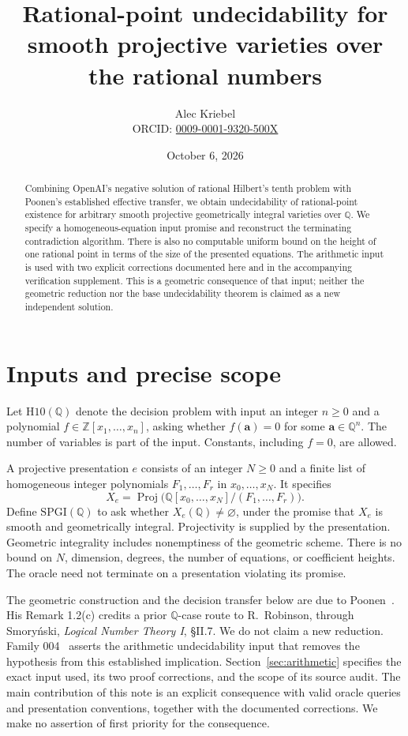 \documentclass[11pt]{article}
\title{Rational-point undecidability for smooth projective varieties over the rational numbers}
\author{Alec Kriebel\\\small ORCID: \href{https://orcid.org/0009-0001-9320-500X}{0009-0001-9320-500X}}
\date{October 6, 2026}
\newcommand{\Q}{\mathbb Q}
\newcommand{\Z}{\mathbb Z}
\begin{document}
\maketitle
\begin{abstract}
Combining OpenAI's negative solution of rational Hilbert's tenth problem
with Poonen's established effective transfer, we obtain undecidability of
rational-point existence for arbitrary smooth projective geometrically
integral varieties over $\Q$. We specify a homogeneous-equation input
promise and reconstruct the terminating contradiction algorithm. There is
also no computable uniform bound on the height of one rational point in
terms of the size of the presented equations. The arithmetic input is used
with two explicit corrections documented here and in the accompanying
verification supplement. This is a geometric consequence of that input;
neither the geometric reduction nor the base undecidability theorem is
claimed as a new independent solution.
\end{abstract}

\section{Inputs and precise scope}
Let $\mathrm{H10}(\Q)$ denote the decision problem with input an integer
$n\geq0$ and a polynomial $f\in\Z[x_1,\ldots,x_n]$, asking whether
$f(\mathbf a)=0$ for some $\mathbf a\in\Q^n$. The number of variables
is part of the input. Constants, including $f=0$, are allowed.

A projective presentation $e$ consists of an integer $N\geq0$ and a finite
list of homogeneous integer polynomials $F_1,\ldots,F_r$ in
$x_0,\ldots,x_N$. It specifies
\[
 X_e=\operatorname{Proj}\bigl(\Q[x_0,\ldots,x_N]/(F_1,\ldots,F_r)\bigr).
\]
Define $\mathrm{SPGI}(\Q)$ to ask whether $X_e(\Q)\ne\varnothing$,
under the promise that $X_e$ is smooth and geometrically integral.
Projectivity is supplied by the presentation. Geometric integrality includes
nonemptiness of the geometric scheme. There is no bound on $N$, dimension,
degrees, the number of equations, or coefficient heights. The oracle need
not terminate on a presentation violating its promise.

The geometric construction and the decision transfer below are due to
Poonen~\cite{Poonen}. His Remark 1.2(c) credits a prior $\Q$-case route to
R.~Robinson, through Smory\'nski, \emph{Logical Number Theory I}, \S II.7.
We do not claim a new reduction. Family 004~\cite{OpenAI} asserts the
arithmetic undecidability input that removes the hypothesis from this
established implication. Section~\ref{sec:arithmetic} specifies the exact
input used, its two proof corrections, and the scope of its source audit.
The main contribution of this note is an explicit consequence with valid
oracle queries and presentation conventions, together with the documented
corrections. We make no assertion of first priority for the consequence.
\end{document}
